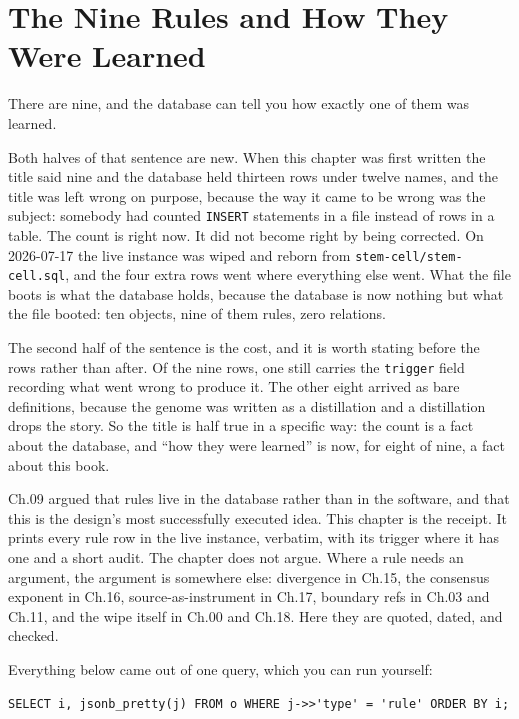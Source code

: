 \chapter{The Nine Rules and How They Were Learned}\label{ch:the-rules}

There are nine, and the database can tell you how exactly one of them was learned.

Both halves of that sentence are new. When this chapter was first written the title said nine and the database held thirteen rows under twelve names, and the title was left wrong on purpose, because the way it came to be wrong was the subject: somebody had counted \texttt{INSERT} statements in a file instead of rows in a table. The count is right now. It did not become right by being corrected. On 2026-07-17 the live instance was wiped and reborn from \texttt{stem-cell/stem-cell.sql}, and the four extra rows went where everything else went. What the file boots is what the database holds, because the database is now nothing but what the file booted: ten objects, nine of them rules, zero relations.

The second half of the sentence is the cost, and it is worth stating before the rows rather than after. Of the nine rows, one still carries the \texttt{trigger} field recording what went wrong to produce it. The other eight arrived as bare definitions, because the genome was written as a distillation and a distillation drops the story. So the title is half true in a specific way: the count is a fact about the database, and ``how they were learned'' is now, for eight of nine, a fact about this book.

Ch.09 argued that rules live in the database rather than in the software, and that this is the design's most successfully executed idea. This chapter is the receipt. It prints every rule row in the live instance, verbatim, with its trigger where it has one and a short audit. The chapter does not argue. Where a rule needs an argument, the argument is somewhere else: divergence in Ch.15, the consensus exponent in Ch.16, source-as-instrument in Ch.17, boundary refs in Ch.03 and Ch.11, and the wipe itself in Ch.00 and Ch.18. Here they are quoted, dated, and checked.

Everything below came out of one query, which you can run yourself:

\begin{lstlisting}
SELECT i, jsonb_pretty(j) FROM o WHERE j->>'type' = 'rule' ORDER BY i;
\end{lstlisting}

